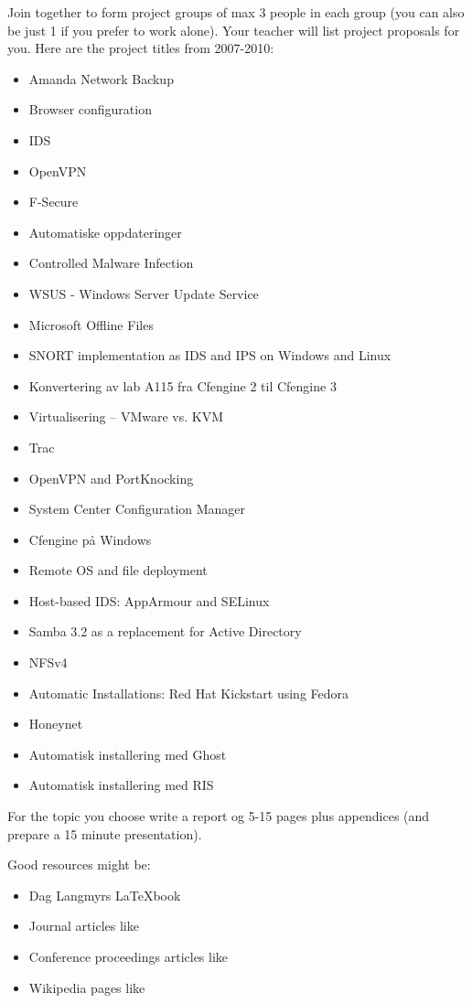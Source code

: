 Join together to form project groups of max 3 people in each group (you can
also be just 1 if you prefer to work alone). Your teacher will list project
proposals for you. Here are the project titles from 2007-2010:
\begin{itemize}
\item Amanda Network Backup
\item Browser configuration
\item IDS
\item OpenVPN
\item F-Secure
\item Automatiske oppdateringer
\item Controlled Malware Infection
\item WSUS - Windows Server Update Service
\item Microsoft Offline Files
\item SNORT implementation as IDS and IPS on Windows and Linux
\item Konvertering av lab A115 fra Cfengine 2 til Cfengine 3
\item Virtualisering – VMware vs. KVM
\item Trac
\item OpenVPN and PortKnocking
\item System Center Configuration Manager
\item Cfengine på Windows
\item Remote OS and file deployment
\item Host-based IDS: AppArmour and SELinux
\item Samba 3.2 as a replacement for Active Directory
\item NFSv4
\item Automatic Installations: Red Hat Kickstart using Fedora
\item Honeynet
\item Automatisk installering med Ghost
\item Automatisk installering med RIS
\end{itemize}
For the topic you choose write a report og 5-15 pages plus appendices (and prepare a 15
minute presentation).

Good resources might be:
\begin{itemize}
\item Dag Langmyrs \LaTeX book~\cite{Langmyr:03}
\item Journal articles like~\cite{Klein:09}
\item Conference proceedings articles like~\cite{Begnum:07} 
\item Wikipedia pages like~\cite{wikipedia:kerberos:10}
\end{itemize}

